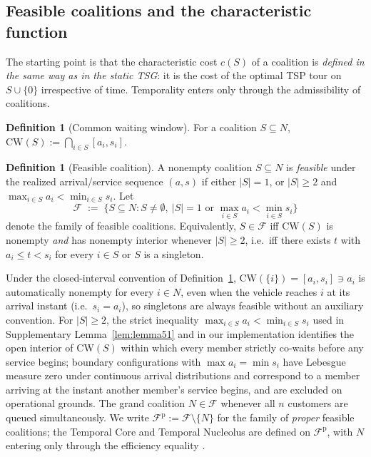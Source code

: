 \documentclass[11pt]{article}
\theoremstyle{plain}
\theoremstyle{definition}
\newtheorem{definition}[theorem]{Definition}
\theoremstyle{remark}
\newcommand{\F}{\mathcal{F}}
\newcommand{\Fp}{\mathcal{F}^{\mathrm{p}}}
\newcommand{\CW}{\mathrm{CW}}
\begin{document}
\subsection{Feasible coalitions and the characteristic function}

The starting point is that the characteristic cost $c(S)$ of a coalition is \emph{defined in the same way as in the static TSG}: it is the cost of the optimal TSP tour on $S\cup\{0\}$ irrespective of time. Temporality enters only through the admissibility of coalitions.

\begin{definition}[Common waiting window]
\label{def:cw}
For a coalition $S\subseteq N$,
$\CW(S) := \bigcap_{i\in S} [a_i, s_i]$.
\end{definition}

\begin{definition}[Feasible coalition]
\label{def:feasible}
A nonempty coalition $S\subseteq N$ is \emph{feasible} under the realized arrival/service sequence $(a, s)$ if either $|S|=1$, or $|S|\ge 2$ and $\max_{i\in S} a_i < \min_{i\in S} s_i$. Let
\[
\F \;:=\; \bigl\{S\subseteq N : S\neq\emptyset,\ \text{$|S|=1$ or } \max_{i\in S} a_i < \min_{i\in S} s_i\bigr\}
\]
denote the family of feasible coalitions. Equivalently, $S\in\F$ iff $\CW(S)$ is nonempty \emph{and} has nonempty interior whenever $|S|\ge 2$, i.e.\ iff there exists $t$ with $a_i\le t<s_i$ for every $i\in S$ or $S$ is a singleton.
\end{definition}

Under the closed-interval convention of Definition~\ref{def:cw}, $\CW(\{i\})=[a_i,s_i]\ni a_i$ is automatically nonempty for every $i\in N$, even when the vehicle reaches $i$ at its arrival instant (i.e.\ $s_i=a_i$), so singletons are always feasible without an auxiliary convention. For $|S|\ge 2$, the strict inequality $\max_{i\in S}a_i<\min_{i\in S}s_i$ used in Supplementary Lemma~\ref{lem:lemma51} and in our implementation identifies the open interior of $\CW(S)$ within which every member strictly co-waits before any service begins; boundary configurations with $\max a_i=\min s_i$ have Lebesgue measure zero under continuous arrival distributions and correspond to a member arriving at the instant another member's service begins, and are excluded on operational grounds. The grand coalition $N\in\F$ whenever all $n$ customers are queued simultaneously. We write $\Fp := \F\setminus\{N\}$ for the family of \emph{proper} feasible coalitions; the Temporal Core and Temporal Nucleolus are defined on $\Fp$, with $N$ entering only through the efficiency equality \citep{myerson1977graphs,bilbao2000}.
\end{document}
